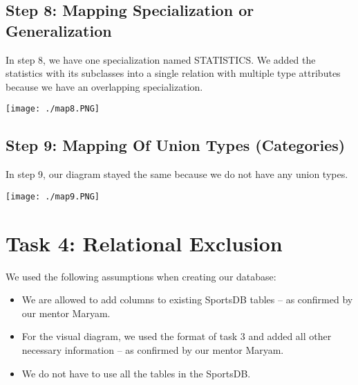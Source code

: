\documentclass[titlepage]{article}
\begin{document}
\subsection{Step 8: Mapping Specialization or Generalization}
\vspace{1em}
\noindent
In step 8, we have one specialization named STATISTICS. We added the statistics with its
subclasses into a single relation with multiple type attributes because we have an
overlapping specialization.
\vspace{1em}
\begin{center}
\texttt{[image: ./map8.PNG]}
\end{center}
\newpage


\subsection{Step 9: Mapping Of Union Types (Categories)}
\vspace{1em}
\noindent
In step 9, our diagram stayed the same because we do not have any union types.
\vspace{1em}
\begin{center}
\texttt{[image: ./map9.PNG]}
\end{center}
\newpage



\section{Task 4: Relational Exclusion}

\vspace{1em}

We used the following assumptions when creating our database:

\begin{itemize}
  \item We are allowed to add columns to existing SportsDB tables – as confirmed by our mentor Maryam.
  \item For the visual diagram, we used the format of task 3 and added all other necessary information – as confirmed by our mentor Maryam.
  \item We do not have to use all the tables in the SportsDB.
\end{itemize}
\end{document}
